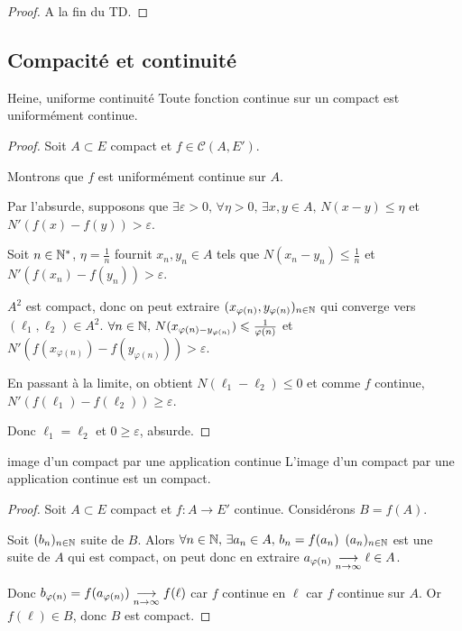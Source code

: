 \begin{proof}
    A la fin du TD.
\end{proof}


\subsection{Compacité et continuité }

\begin{theoreme}{Heine, uniforme continuité}{}
    Toute fonction continue sur un compact est uniformément continue. 
\end{theoreme}


\begin{proof}
    Soit $A \subset E$ compact et $f \in \mathscr C(A, E')$. 

    Montrons que $f$ est uniformément continue sur $A$. 

    Par l'absurde, supposons que $\exists \varepsilon > 0, \, \forall \eta > 0, \, \exists x, y \in A, \, N(x - y) \leqslant \eta$ et $N'(f(x) - f(y)) > \varepsilon$.

    Soit $n \in \mathbb{N}^*$, $\eta = \frac 1 n$ fournit $x_n, y_n \in A$ tels que $N(x_n - y_n) \leqslant \frac 1 n$
    et $N'(f(x_n) - f(y_n)) > \varepsilon$.

    $A^2$ est compact, donc on peut extraire $(x_{\varphi(n)}, y_{\varphi(n)})_{n \in \mathbb{N}}$ qui converge vers $(\ell_1, \ell_2) \in A^2$.
    $\forall n \in \mathbb{N}, \, N(x_{\varphi(n) - y_{\varphi(n)}}) \leqslant \frac 1 {\varphi(n)}$ et $N'(f(x_{\varphi(n)}) - f(y_{\varphi(n)})) > \varepsilon$.

    En passant à la limite, on obtient $N(\ell_1 - \ell_2) \leqslant 0$ et comme $f$ continue, 
    $N'(f(\ell_1) - f(\ell_2)) \geqslant \varepsilon$.

    Donc $\ell_1 = \ell_2$ et $0 \geqslant \varepsilon$, absurde.
\end{proof}

\begin{theoreme}{image d'un compact par une application continue}{}
    L'image d'un compact par une application continue est un compact. 
\end{theoreme}


\begin{proof}
    Soit $A \subset E$ compact et $f : A \to E'$ continue. Considérons $B = f(A)$. 

    Soit $(b_n)_{n \in \mathbb{N}}$ suite de $B$. Alors $\forall n \in \mathbb{N}, \, \exists a_n \in A, \, b_n = f(a_n)$
    $(a_n)_{n \in \mathbb{N}}$ est une suite de $A$ qui est compact, on peut donc en extraire 
    $a_{\varphi(n)} \underset{n \to \infty}{\longrightarrow} \ell \in A$. 

    Donc $b_{\varphi(n)} = f(a_{\varphi(n)}) \underset{n \to \infty}{\longrightarrow} f(\ell) $ car $f$ continue en 
    $\ell$ car $f$ continue sur $A$. Or $f(\ell) \in B$, donc $B$ est compact.
\end{proof}

